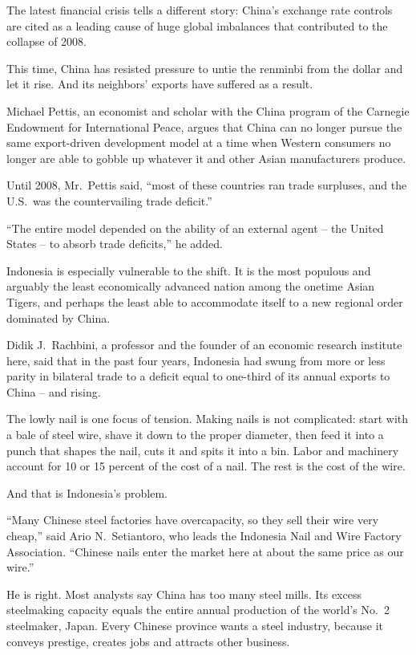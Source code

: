 ﻿\documentclass[12pt]{article}
\begin{document}
The latest financial crisis tells a different story: China's exchange rate controls are cited as a
leading cause of huge global imbalances that contributed to the collapse of 2008.

This time, China has resisted pressure to untie the renminbi from the dollar and let it rise. And
its neighbors' exports have suffered as a result.

Michael Pettis, an economist and scholar with the China program of the Carnegie Endowment for
International Peace, argues that China can no longer pursue the same export-driven development model
at a time when Western consumers no longer are able to gobble up whatever it and other Asian
manufacturers produce.

Until 2008, Mr.~Pettis said, ``most of these countries ran trade surpluses, and the U.S.~was the
countervailing trade deficit.''

``The entire model depended on the ability of an external agent -- the United States -- to absorb
trade deficits,'' he added.

Indonesia is especially vulnerable to the shift. It is the most populous and arguably the least
economically advanced nation among the onetime Asian Tigers, and perhaps the least able to
accommodate itself to a new regional order dominated by China.

Didik J.~Rachbini, a professor and the founder of an economic research institute here, said that in
the past four years, Indonesia had swung from more or less parity in bilateral trade to a deficit
equal to one-third of its annual exports to China -- and rising.

The lowly nail is one focus of tension. Making nails is not complicated: start with a bale of steel
wire, shave it down to the proper diameter, then feed it into a punch that shapes the nail, cuts it
and spits it into a bin. Labor and machinery account for 10 or 15 percent of the cost of a nail. The
rest is the cost of the wire.

And that is Indonesia's problem.

``Many Chinese steel factories have overcapacity, so they sell their wire very cheap,'' said Ario
N.~Setiantoro, who leads the Indonesia Nail and Wire Factory Association. ``Chinese nails enter the
market here at about the same price as our wire.''

He is right. Most analysts say China has too many steel mills. Its excess steelmaking capacity
equals the entire annual production of the world's No.~2 steelmaker, Japan. Every Chinese province
wants a steel industry, because it conveys prestige, creates jobs and attracts other business.
\end{document}
